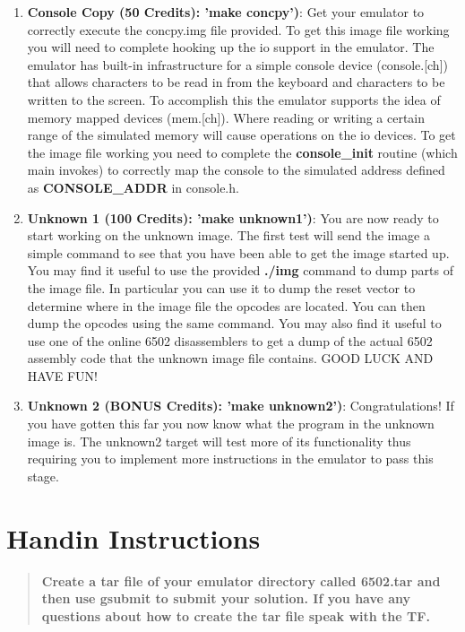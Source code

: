 \documentclass[11pt]{article}
\begin{document}
{\begin{enumerate}
\item{\bf Console Copy (50 Credits): 'make concpy')}: Get your
  emulator to correctly execute the concpy.img file provided.  To get
  this image file working you will need to complete hooking up the io
  support in the emulator.  The emulator has built-in infrastructure
  for a simple console device (console.[ch]) that allows characters to
  be read in from the keyboard and characters to be written to the
  screen.  To accomplish this the emulator supports the idea of memory
  mapped devices (mem.[ch]).  Where reading or writing a certain range
  of the simulated memory will cause operations on the io devices.  To
  get the image file working you need to complete the {\bf console\_init}
  routine (which main invokes) to correctly map the console to the
  simulated address defined as {\bf CONSOLE\_ADDR} in console.h.

\item{\bf Unknown 1 (100 Credits): 'make unknown1')}: You are now
  ready to start working on the unknown image.  The first test will
  send the image a simple command to see that you have been able to
  get the image started up.  You may find it useful to use the
  provided {\bf ./img} command to dump parts of the image file.  In
  particular you can use it to dump the reset vector to determine
  where in the image file the opcodes are located.  You can then dump
  the opcodes using the same command. You may also find it useful to
  use one of the online 6502 disassemblers to get a dump of the actual
  6502 assembly code that the unknown image file contains.  GOOD LUCK
  AND HAVE FUN!

\item{\bf Unknown 2 (BONUS Credits): 'make unknown2')}:
  Congratulations!  If you have gotten this far you now know what the
  program in the unknown image is.  The unknown2 target will test more of its
  functionality thus requiring you to implement more instructions in
  the emulator to pass this stage.
\end{enumerate}

\section{Handin Instructions}

\begin{quote}

\bf Create a tar file of your emulator directory called 6502.tar and
then use gsubmit to submit your solution.  If you have any questions 
about how to create the tar file speak with the TF.
\end{quote}

}
\end{document}
